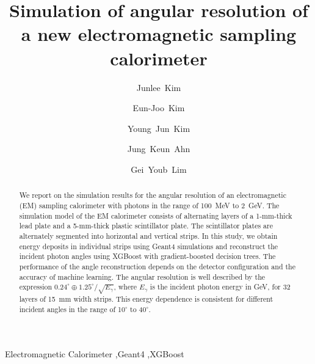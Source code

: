 \documentclass[12pt,times,draftclsnofoot,a4paper]{elsarticle}
\begin{document}
\begin{frontmatter}

\setcounter{page}{0}
\title{Simulation of angular resolution of a new electromagnetic sampling calorimeter}

\author[jbnu]{Junlee~Kim}

\author[jbnu]{Eun-Joo~Kim}

\author[korea]{Young~Jun~Kim}
\author[korea]{Jung~Keun~Ahn}
\author[kek]{Gei~Youb~Lim}

\address[jbnu]{Division of Science Education, Jeonbuk National University, Jeonju 54896, Korea}
\address[korea]{Department of Physics, Korea University, Seoul 02841, Korea}
\address[kek]{Institute of Particle and Nuclear Studies (IPNS), High Energy Accelerator Research Organization (KEK), Tsukuba 305-0801, Japan}


\begin{abstract}
We report on the simulation results for the angular resolution of an electromagnetic (EM) sampling calorimeter with photons in the range of 100~MeV to 2~GeV. The simulation model of the EM calorimeter consists of alternating layers of a 1-mm-thick lead plate and a 5-mm-thick plastic scintillator plate. The scintillator plates are alternately segmented into horizontal and vertical strips. In this study, we obtain energy deposits in individual strips using Geant4 simulations and reconstruct the incident photon angles using XGBoost with gradient-boosted decision trees. The performance of the angle reconstruction depends on the detector configuration and the accuracy of machine learning. The angular resolution is well described by the expression $0.24^{\circ} \oplus 1.25^{\circ}/\sqrt{E_{\gamma}}$, where $E_{\gamma}$ is the incident photon energy in GeV, for 32 layers of 15~mm width strips. This energy dependence is consistent for different incident angles in the range of 10$^{\circ}$ to 40$^{\circ}$.

\end{abstract}
\begin{keyword}
Electromagnetic Calorimeter \sep Geant4 \sep XGBoost
\end{keyword}

\end{frontmatter}
\end{document}
